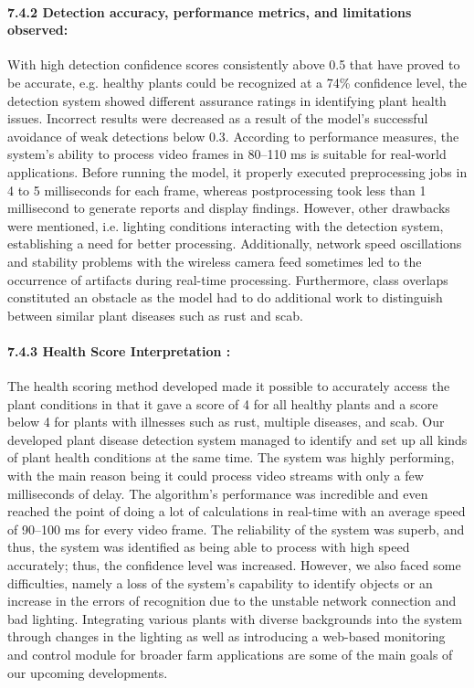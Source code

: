 \documentclass{book} %
\begin{document}
\noindent \textbf{}

\noindent 
\paragraph{7.4.2 Detection accuracy, performance metrics, and limitations observed: }

\noindent With high detection confidence scores consistently above 0.5 that have proved to be accurate, e.g. healthy plants could be recognized at a 74\% confidence level, the detection system showed different assurance ratings in identifying plant health issues. Incorrect results were decreased as a result of the model's successful avoidance of weak detections below 0.3. According to performance measures, the system's ability to process video frames in 80--110 ms is suitable for real-world applications. Before running the model, it properly executed preprocessing jobs in 4 to 5 milliseconds for each frame, whereas postprocessing took less than 1 millisecond to generate reports and display findings. However, other drawbacks were mentioned, i.e. lighting conditions interacting with the detection system, establishing a need for better processing. Additionally, network speed oscillations and stability problems with the wireless camera feed sometimes led to the occurrence of artifacts during real-time processing. Furthermore, class overlaps constituted an obstacle as the model had to do additional work to distinguish between similar plant diseases such as rust and scab. 

\noindent 

\noindent 

\noindent 
\paragraph{7.4.3 Health Score Interpretation :}

\noindent The health scoring method developed made it possible to accurately access the plant conditions in that it gave a score of 4 for all healthy plants and a score below 4 for plants with illnesses such as rust, multiple diseases, and scab. Our developed plant disease detection system managed to identify and set up all kinds of plant health conditions at the same time. The system was highly performing, with the main reason being it could process video streams with only a few milliseconds of delay. The algorithm's performance was incredible and even reached the point of doing a lot of calculations in real-time with an average speed of 90--100 ms for every video frame. The reliability of the system was superb, and thus, the system was identified as being able to process with high speed accurately; thus, the confidence level was increased. However, we also faced some difficulties, namely a loss of the system's capability to identify objects or an increase in the errors of recognition due to the unstable network connection and bad lighting. Integrating various plants with diverse backgrounds into the system through changes in the lighting as well as introducing a web-based monitoring and control module for broader farm applications are some of the main goals of our upcoming developments.
\end{document}
